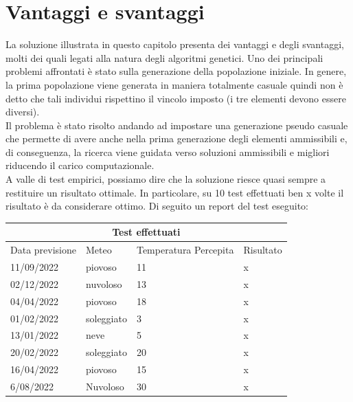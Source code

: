 \documentclass[a4paper, 11pt, oneside]{report}
\begin{document}
            \section{Vantaggi e svantaggi}
            La soluzione illustrata in questo capitolo presenta dei vantaggi e degli svantaggi, molti dei quali legati
            alla natura degli algoritmi genetici.
            Uno dei principali problemi affrontati è stato sulla generazione della popolazione iniziale.
            In genere, la prima popolazione viene generata in maniera totalmente casuale quindi non è detto che
            tali individui rispettino il vincolo imposto (i tre elementi devono essere diversi).\\
            Il problema è stato risolto andando ad impostare una generazione pseudo casuale che permette
            di avere anche nella prima generazione degli elementi ammissibili e, di conseguenza,
            la ricerca viene guidata verso soluzioni ammissibili e migliori riducendo il carico computazionale.\\
            A valle di test empirici, possiamo dire che la soluzione riesce quasi sempre a restituire un risultato ottimale.
            In particolare, su 10 test effettuati ben x volte il risultato è da considerare ottimo.
            Di seguito un report del test eseguito:\\
                \begin{tabular}{ |p{3cm}|p{2cm}|p{2cm}||p{4cm}|}
                    \hline
                    \multicolumn{4}{|c|}{Test effettuati} \\
                    \hline
                    Data previsione & Meteo & Temperatura Percepita & Risultato\\
                    \hline
                    11/09/2022 & piovoso  & 11 & x\\
                    \hline
                    02/12/2022 & nuvoloso  & 13 & x\\
                    \hline
                    04/04/2022 & piovoso  & 18 & x\\
                    \hline
                    01/02/2022 & soleggiato  & 3 & x\\
                    \hline
                    13/01/2022 & neve  & 5 & x\\
                    \hline
                    20/02/2022 & soleggiato  & 20 & x\\
                    \hline
                    16/04/2022 & piovoso  & 15 & x\\
                    \hline
                    6/08/2022 & Nuvoloso  & 30 & x\\
                    \hline
                \end{tabular}
\end{document}

